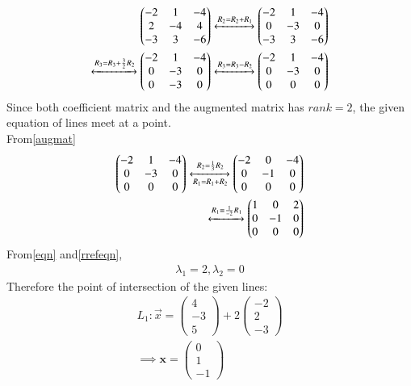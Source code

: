 \documentclass[journal,12pt,twocolumn]{IEEEtran}
\newcommand{\myvec}[1]{\ensuremath{\begin{pmatrix}#1\end{pmatrix}}}
\numberwithin{equation}{subsection}
\let\vec\mathbf
\begin{document}
\begin{align}
    \myvec{-2 & 1  & -4 \\ 2 & -4 &  4\\ -3 & 3  & -6}\label{eqaug}\xleftrightarrow{R_2=R_2+R_1}\myvec{-2&1&-4\\0&-3&0\\-3&3&-6}\\
    \xleftrightarrow{R_3=R_3+\frac{3}{2} R_2}\myvec{-2&1&-4\\0&-3&0\\0&-3&0}\xleftrightarrow{R_3=R_3- R_2}\myvec{-2&1&-4\\0&-3&0\\0&0&0}\label{augmat}
\end{align}
Since both coefficient matrix and the augmented matrix has $rank=2$, the given equation of lines meet at a point.\\ 
From\eqref{augmat}
\begin{align}
\myvec{-2&1&-4\\0&-3&0\\0&0&0}\xleftrightarrow[R_1=R_1+R_2]{R_2=\frac{1}{3}R_2}\myvec{-2&0&-4\\0&-1&0\\0&0&0}
\\\xleftrightarrow{R_1=\frac{1}{-2}R_1}\myvec{1&0&2\\0&-1&0\\0&0&0}\label{rrefeqn}
\end{align}
From\eqref{eqn} and\eqref{rrefeqn},
\begin{align}
 \lambda_1=2,\lambda_2=0  
\end{align}
Therefore the point of intersection of the given lines:
\begin{align}
 L_1 : \Vec{x}=\myvec{4\\-3\\5}+2\myvec{-2\\2\\-3}\\
 \implies \vec{x}=\myvec{0\\1\\-1}\label{pointcoor}
\end{align}
\end{document}
